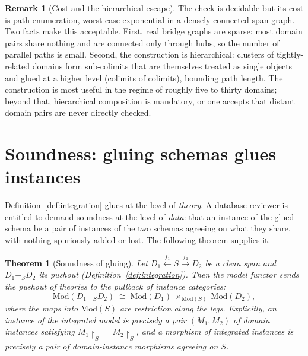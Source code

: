 \documentclass[11pt]{article}
\theoremstyle{plain}
\newtheorem{theorem}{Theorem}
\theoremstyle{definition}
\newtheorem{remark}{Remark}
\newcommand{\Mod}{\mathrm{Mod}}
\newcommand{\restrict}[1]{\!\!\upharpoonright_{#1}}
\begin{document}
\begin{remark}[Cost and the hierarchical escape]\label{rem:cost}
The check is decidable but its cost is path enumeration, worst-case exponential in a densely connected span-graph. Two facts make this acceptable. First, real bridge graphs are sparse: most domain pairs share nothing and are connected only through hubs, so the number of parallel paths is small. Second, the construction is hierarchical: clusters of tightly-related domains form sub-colimits that are themselves treated as single objects and glued at a higher level (colimits of colimits), bounding path length. The construction is most useful in the regime of roughly five to thirty domains; beyond that, hierarchical composition is mandatory, or one accepts that distant domain pairs are never directly checked.
\end{remark}

\section{Soundness: gluing schemas glues instances}\label{sec:soundness}

Definition~\ref{def:integration} glues at the level of \emph{theory}. A database reviewer is entitled to demand soundness at the level of \emph{data}: that an instance of the glued schema be a pair of instances of the two schemas agreeing on what they share, with nothing spuriously added or lost. The following theorem supplies it.

\begin{theorem}[Soundness of gluing]\label{thm:soundness}
Let $D_1 \xleftarrow{f_1} S \xrightarrow{f_2} D_2$ be a clean span and $D_1 +_S D_2$ its pushout (Definition~\ref{def:integration}). Then the model functor sends the pushout of theories to the pullback of instance categories:
\[
\Mod(D_1 +_S D_2)\;\cong\;\Mod(D_1)\;\times_{\Mod(S)}\;\Mod(D_2),
\]
where the maps into $\Mod(S)$ are restriction along the legs. Explicitly, an instance of the integrated model is precisely a pair $(M_1,M_2)$ of domain instances satisfying $M_1\restrict{S} = M_2\restrict{S}$, and a morphism of integrated instances is precisely a pair of domain-instance morphisms agreeing on $S$.
\end{theorem}
\end{document}
